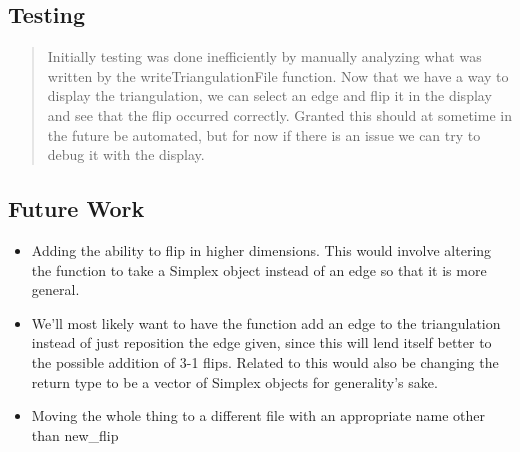 \documentclass[10pt]{article}%
\begin{document}
\subsection*{Testing}

\begin{quotation} Initially testing was done inefficiently by manually analyzing what was written by the writeTriangulationFile  function. Now that we have a way to display the triangulation, we can select an edge and flip it in the display and see that the flip occurred correctly. Granted this should at sometime in the future be automated, but for now if there is an issue we can try to debug it with the display.\end{quotation}

\subsection*{Future Work}

\begin{quotation} \end{quotation}\begin{itemize}\item  Adding the ability to flip in higher dimensions. This would involve altering the function to take a Simplex object instead of an edge so that it is more general.
\end{itemize}
\begin{quotation} \end{quotation}\begin{itemize}\item  We'll most likely want to have the function add an edge to the triangulation instead of just reposition the edge given, since this will lend itself better to the possible addition of 3-1 flips. Related to this would also be changing the return type to be a vector of Simplex objects for generality's sake.
\end{itemize}
\begin{quotation} \end{quotation}\begin{itemize}\item  Moving the whole thing to a different file with an appropriate name other than new\_flip
\end{itemize}
    

%
\end{document}
